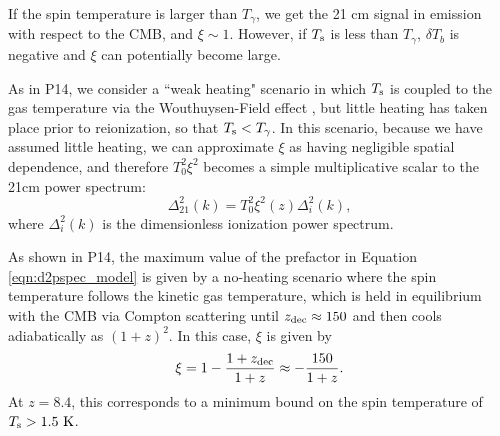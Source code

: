 \documentclass[twocolumn,numberedappendix]{emulateapj} \shorttitle{New Limits on the 21 cm Power Spectrum at $z=8.4$}
\newcommand{\Tspin}{T_{\rm s}}
\newcommand{\Tcmb}{T_\gamma}
\begin{document}
If the spin temperature is larger than $\Tcmb$, we get the 21 cm signal in
emission with respect to the CMB, and $\xi\sim1$. However, if $\Tspin$ is less than $\Tcmb$,
$\delta T_b$ is negative and $\xi$ can potentially become large.

As in P14,
we consider a ``weak heating" scenario in which $\Tspin$ is coupled to the gas temperature via
the Wouthuysen-Field effect \citep{wouthuysen1952,field1958,hirata2006},
but little heating has taken place prior to reionization, so that $\Tspin<\Tcmb$.
In this scenario, 
because we have assumed little heating, we can approximate $\xi$ as having negligible spatial
dependence, and therefore $T_0^2\xi^2$ becomes a simple multiplicative scalar to the 
21cm power spectrum:
\begin{equation}\label{eqn:d2pspec_model}
    \Delta^2_{21}(k) = T_0^2\xi^2(z)\Delta_{i}^{2}(k),%
\end{equation}
where $\Delta_{i}^{2}(k)$ is the dimensionless ionization power spectrum. 

As shown in P14, the maximum value of the
prefactor in Equation \eqref{eqn:d2pspec_model} is given by 
a no-heating scenario where the spin temperature follows the kinetic gas temperature,
which is held in equilibrium with the CMB via Compton scattering until $z_{\rm dec}\approx150$
\citep{furlanetto_et_al2006} and then cools adiabatically
as $(1+z)^2$.
In this case, $\xi$ is given by
\begin{equation}\label{eqn:maxxi}
\xi = 1 -\frac{1+z_{\rm dec}}{1+z} \approx -\frac{150}{1+z}.
\end{equation}
At $z=8.4$, this corresponds to a minimum bound on the spin temperature of $\Tspin>1.5~{\rm K}$.
\end{document}
